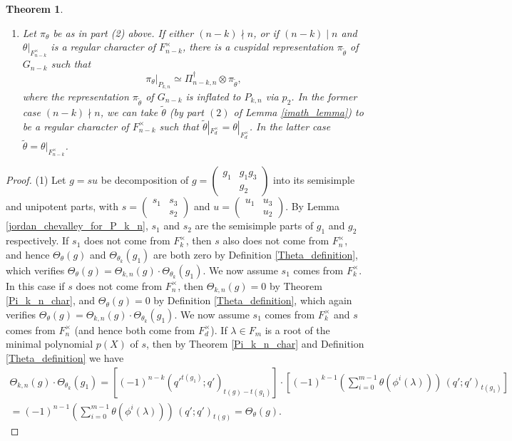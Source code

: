 \documentclass[reqno]{amsart}
\newtheorem{theorem}{Theorem}[section]
\theoremstyle{definition}
\theoremstyle{remark}
\numberwithin{equation}{section}
\DeclareMathOperator{\Ind}{Ind}
\DeclareMathOperator{\St}{St}
\newcommand{\bbsm}{\left (\begin{smallmatrix}}      \newcommand{\besm}{\end{smallmatrix}\right )}
\begin{document}
{{\begin{theorem}
\begin{enumerate}
\item[\emph{(3)}] Let $\pi_\theta$ be as in part (2) above. If  either $(n-k) \nmid n$, or if $(n-k) \mid n$ and $\theta|_{F_{n-k}^\times}$ is a regular character of $F_{n-k}^\times$, there is a cuspidal representation $\pi_{\tilde\theta}$ of $G_{n-k}$ such that 
    \[ \pi_\theta|_{P_{k,n}} \simeq \Pi_{n-k,n}^\dagger \otimes \pi_{\tilde \theta},
    \]
    where the representation $\pi_{\tilde\theta}$ of $G_{n-k}$ is inflated to $P_{k,n}$ via $p_2$.  In the former case $(n-k) \nmid n$, we can take $\tilde\theta$ (by part $(2)$ of Lemma \ref{imath_lemma})  to be a regular character of $F_{n-k}^\times$ such that  $\tilde\theta|_{F_d^\times} = \theta|_{F_d^\times}$. In the latter case $\tilde \theta = \theta|_{F_{n-k}^\times}$.

    \end{enumerate}
\end{theorem}
\begin{proof} (1) 
Let $g = s u$ be decomposition of $g=\bbsm g_1 & g_1g_3\\ & g_2 \besm$  into its semisimple and unipotent parts, with $s=\bbsm s_1 & s_3\\ &s_2 \besm$ and $u= \bbsm u_1  &u_3\\ & u_2 \besm$. By Lemma \ref{jordan_chevalley_for_P_k_n},  $s_1$ and $s_2$ are the semisimple parts of $g_1$ and $g_2$ respectively.  If $s_1$  does not come from $F_k^\times$, then $s$ also does not come from $F_n^\times$, and hence  $\Theta_\theta(g)$ and $\Theta_{\theta_k}(g_1)$ are both zero by Definition \ref{Theta_definition}, which verifies  $\Theta_\theta(g)= \Theta_{k,n}(g) \cdot \Theta_{\theta_k}(g_1)$. We now assume $s_1$ comes from $F_k^\times$. In this case if $s$ does not come from $F_n^\times$, then $\Theta_{k,n}(g)=0$ by Theorem \ref{Pi_k_n_char}, and $\Theta_\theta(g)=0$ by Definition \ref{Theta_definition}, which again verifies  $\Theta_\theta(g)= \Theta_{k,n}(g) \cdot \Theta_{\theta_k}(g_1)$. We now assume $s_1$ comes from $F_k^\times$ and $s$ comes from $F_n^\times$ (and hence both come from $F_d^\times$). If $\lambda \in F_m$ is a root of the minimal polynomial $p(X)$ of $s$, then by Theorem \ref{Pi_k_n_char} and Definition \ref{Theta_definition} we have
\begin{multline*} \Theta_{k,n}(g) \cdot \Theta_{\theta_k}(g_1)= \left[ (-1)^{n-k} ({q'}^{t(g_1)};q')_{t(g)-t(g_1)}\right]  \cdot 
\left[(-1)^{k-1} \left( \sum_{i=0}^{m-1} \theta(\phi^i(\lambda)) \right) \,(q';q')_{t(g_1)} \right] \\ = (-1)^{n-1} \left( \sum_{i=0}^{m-1} \theta(\phi^i(\lambda)) \right) \, (q';q')_{t(g)} = \Theta_\theta(g).
\end{multline*}




\end{proof}}}
\end{document}
